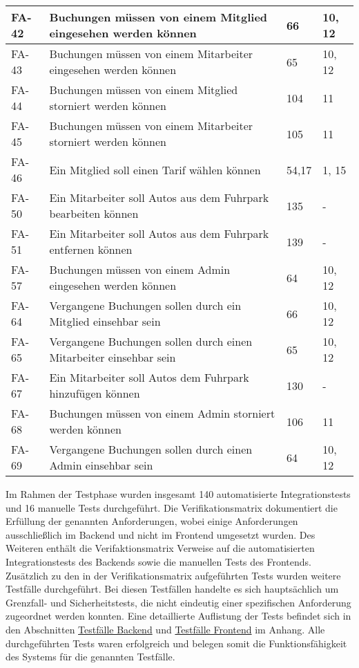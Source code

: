 \begin{longtable}{|m{2cm}|m{6.5cm}|m{2.5cm}|m{2.5cm}|}
    \hline
    FA-42 & Buchungen müssen von einem Mitglied eingesehen werden können & 66 & 10, 12 \\
    \hline
    FA-43 & Buchungen müssen von einem Mitarbeiter eingesehen werden können & 65 & 10, 12 \\
    \hline
    FA-44 & Buchungen müssen von einem Mitglied storniert werden können & 104 & 11 \\
    \hline
    FA-45 & Buchungen müssen von einem Mitarbeiter storniert werden können & 105 & 11 \\
    \hline
    FA-46 & Ein Mitglied soll einen Tarif wählen können & 54,17 & 1, 15 \\
    \hline
    FA-50 & Ein Mitarbeiter soll Autos aus dem Fuhrpark bearbeiten können & 135 & - \\
    \hline
    FA-51 & Ein Mitarbeiter soll Autos aus dem Fuhrpark entfernen können & 139 & - \\
    \hline
    FA-57 & Buchungen müssen von einem Admin eingesehen werden können & 64 & 10, 12 \\
    \hline
    FA-64 & Vergangene Buchungen sollen durch ein Mitglied einsehbar sein & 66 & 10, 12 \\
    \hline
    FA-65 & Vergangene Buchungen sollen durch einen Mitarbeiter einsehbar sein & 65 & 10, 12 \\
    \hline
    FA-67 & Ein Mitarbeiter soll Autos dem Fuhrpark hinzufügen können & 130 & - \\
    \hline
    FA-68 & Buchungen müssen von einem Admin storniert werden können & 106 & 11 \\
    \hline
    FA-69 & Vergangene Buchungen sollen durch einen Admin einsehbar sein & 64 & 10, 12 \\
    \hline
\end{longtable}
\label{tab:verifikations_matrix}

Im Rahmen der Testphase wurden insgesamt 140 automatisierte Integrationstests und 16 manuelle Tests durchgeführt.
Die Verifikationsmatrix dokumentiert die Erfüllung der genannten Anforderungen, wobei einige Anforderungen ausschließlich im Backend und nicht im Frontend umgesetzt wurden.
Des Weiteren enthält die Verifaktionsmatrix Verweise auf die automatisierten Integrationstests des Backends sowie die manuellen Tests des Frontends.
Zusätzlich zu den in der Verifikationsmatrix aufgeführten Tests wurden weitere Testfälle durchgeführt.
Bei diesen Testfällen handelte es sich hauptsächlich um Grenzfall- und Sicherheitstests, die nicht eindeutig einer spezifischen Anforderung zugeordnet werden konnten.
Eine detaillierte Auflistung der Tests befindet sich in den Abschnitten \hyperref[subsec:testfaelle_backend]{Testfälle Backend}
und \hyperref[subsec:testfaelle_frontend]{Testfälle Frontend} im Anhang.
Alle durchgeführten Tests waren erfolgreich und belegen somit die Funktionsfähigkeit des Systems für die genannten Testfälle.